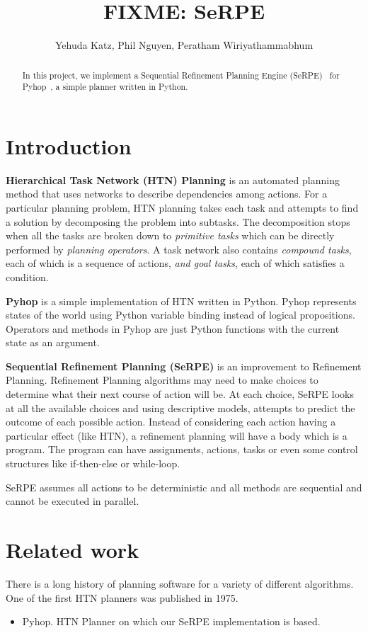 \documentclass[11pt]{article} %
\title{FIXME: SeRPE}
\author{Yehuda Katz, Phil Nguyen, Peratham Wiriyathammabhum}
\begin{document}
\maketitle

\begin{abstract}
In this project, we implement a Sequential Refinement Planning Engine
(SeRPE)~\cite{serpe-draft} for Pyhop~\cite{pyhop},
a simple planner written in Python.
\end{abstract}

\section{Introduction}

\textbf{Hierarchical Task Network (HTN) Planning} is an automated planning method that uses networks
to describe dependencies among actions.
For a particular planning problem, HTN planning takes each task and attempts to find a solution
by decomposing the problem into subtasks. The decomposition stops when all the tasks are broken down to \textit{primitive tasks} which can be directly performed by \textit{planning operators}.
A task network also contains 
\textit{compound tasks}, each of which is a sequence of actions,
\textit{and goal tasks}, each of which satisfies a condition.

\textbf{Pyhop} is a simple implementation of HTN written in Python. 
Pyhop represents states of the world using Python variable binding
 instead of logical propositions. Operators and methods in Pyhop are
 just Python functions with the current state as an argument.

\textbf{Sequential Refinement Planning (SeRPE)} is an improvement to Refinement Planning. Refinement Planning algorithms may need to make choices to determine what their next course of action will be. At each choice, SeRPE looks at all the available choices and using descriptive models, attempts to predict the outcome of each possible action.
Instead of considering each action having a particular effect (like HTN), a refinement planning will have a body which
 is a program. The program can have assignments, actions, tasks or
 even some control structures like if-then-else or while-loop.

SeRPE assumes all actions to be deterministic and all methods are 
sequential and cannot be executed in parallel.

\section{Related work}
There is a long history of planning software for a variety of different algorithms. One of the first HTN planners was published in 1975.
\begin{itemize}
  \item Pyhop. HTN Planner on which our SeRPE implementation is based. \cite{pyhop}
  
\end{itemize}
\end{document}
